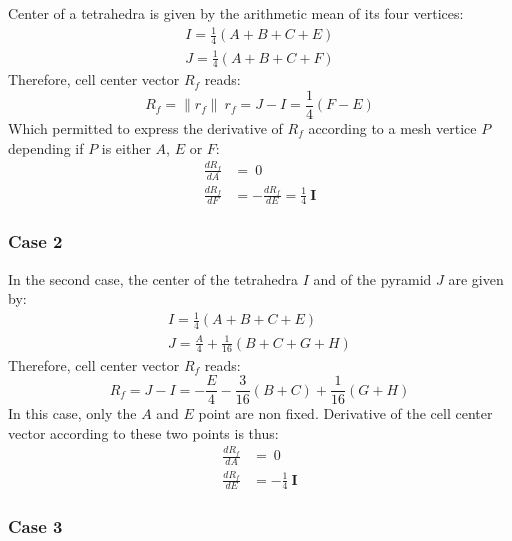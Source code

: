 \documentclass[11pt]{article}
\begin{document}
Center of a tetrahedra is given by the arithmetic mean of its four vertices:
\begin{subequations}
\begin{gather}
I = \frac{1}{4} (A + B + C + E) \\
J = \frac{1}{4} (A + B + C + F)
\end{gather}
\end{subequations} 
Therefore, cell center vector $R_f$ reads:
\begin{equation}
R_f = \| r_f \|\ r_f = J-I = \frac{1}{4} (F - E)
\end{equation}
Which permitted to express the derivative of $R_f$ according to a mesh vertice $P$ depending if $P$ is either $A$, $E$ or $F$:
\begin{subequations}
\begin{align}
\frac{d R_f}{d A} &= \ 0 \\
\frac{d R_f}{d F} &= - \frac{d R_f}{d E} = \frac{1}{4}\ \boldsymbol{I}
\end{align}
\end{subequations} 

\subsubsection{Case 2}

In the second case, the center of the tetrahedra $I$ and of the pyramid $J$ are given by:
\begin{subequations}
\begin{gather}
I = \frac{1}{4} (A + B + C + E) \\
J = \frac{A}{4} + \frac{1}{16} (B + C + G + H)
\end{gather}
\end{subequations} 
Therefore, cell center vector $R_f$ reads:
\begin{equation}
R_f = J-I = -\frac{E}{4} - \frac{3}{16} (B + C) + \frac{1}{16} ( G + H)
\end{equation}
In this case, only the $A$ and $E$ point are non fixed. Derivative of the cell center vector according to these two points is thus:
\begin{subequations}
\begin{align}
\frac{d R_f}{d A} &= \ 0 \\
\frac{d R_f}{d E} &= - \frac{1}{4}\ \boldsymbol{I}
\end{align}
\end{subequations}


\subsubsection{Case 3}
\end{document}
